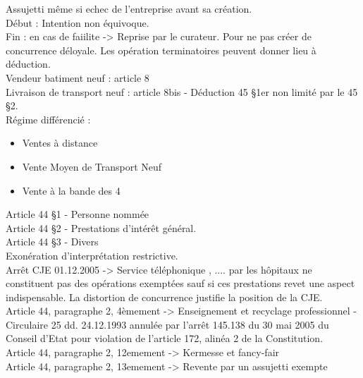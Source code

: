 \documentclass{book}
\begin{document}
Assujetti même si echec de l'entreprise avant sa création.\\

Début : Intention non équivoque.\\

Fin : en cas de faiilite -> Reprise par le curateur. Pour ne pas créer de concurrence déloyale. Les opération terminatoires peuvent donner lieu à déduction.\\

Vendeur batiment neuf : article 8\\

Livraison de transport neuf : article 8bis - Déduction 45 §1er non limité par le 45 §2.\\

Régime différencié :\\

\begin{itemize}
\item Ventes à distance
\item Vente Moyen de Transport Neuf
\item Vente à la bande des 4
\end{itemize}

\null

Article 44 §1 - Personne nommée\\
Article 44 §2 - Prestations d'intérêt général.\\
Article 44 §3 - Divers\\

Exonération d'interprétation restrictive.\\

Arrêt CJE 01.12.2005 -> Service téléphonique , .... par les hôpitaux ne constituent pas des opérations exemptées sauf si ces prestations revet une aspect indispensable. La distortion de concurrence justifie la position de la CJE.\\

Article 44, paragraphe 2, 4èmement -> Enseignement et recyclage professionnel - Circulaire 25 dd. 24.12.1993 annulée par l'arrêt  145.138 du 30 mai 2005 du Conseil d'Etat pour violation de l'article 172, alinéa 2 de la Constitution. \\

Article 44, paragraphe 2, 12emement -> Kermesse et fancy-fair\\

Article 44, paragraphe 2, 13emement -> Revente par un assujetti exempte\\
\end{document}
